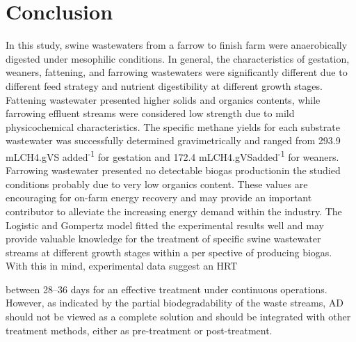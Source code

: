 \section{Conclusion}
In this study, swine wastewaters from a farrow to finish farm were anaerobically digested under mesophilic conditions. In general, the characteristics of gestation, weaners, fattening, and farrowing wastewaters were significantly different due to different feed strategy and nutrient digestibility at different growth stages. Fattening wastewater presented higher solids and organics contents, while farrowing effluent streams were considered low strength due to mild physicochemical characteristics. The specific methane yields for each substrate wastewater was successfully determined gravimetrically and ranged from 293.9 mLCH4.gVS added\textsuperscript{-1} for gestation and 172.4 mLCH4.gVSadded\textsuperscript{-1} for weaners. Farrowing wastewater presented no detectable biogas productionin the studied conditions probably due to very low organics content. These values are encouraging for on-farm energy recovery and may provide an important contributor to
alleviate the increasing energy demand within the industry. The Logistic and Gompertz model fitted the experimental results well and may provide valuable knowledge for the treatment of specific swine wastewater streams at different growth stages within a per
spective of producing biogas. With this in mind, experimental data suggest an HRT

between 28–36 days for an effective treatment under continuous operations. However,
as indicated by the partial biodegradability of the waste streams, AD should not be
viewed as a complete solution and should be integrated with other treatment methods,
either as pre-treatment or post-treatment.
